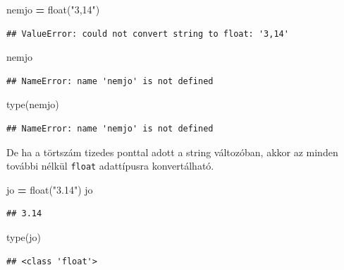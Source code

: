 \documentclass[
]{book}
\newenvironment{Shaded}{\begin{snugshade}}{\end{snugshade}}
\newcommand{\BuiltInTok}[1]{#1}
\newcommand{\NormalTok}[1]{#1}
\newcommand{\OperatorTok}[1]{\textcolor[rgb]{0.81,0.36,0.00}{\textbf{#1}}}
\newcommand{\StringTok}[1]{\textcolor[rgb]{0.31,0.60,0.02}{#1}}
\begin{document}
\begin{Shaded}
\begin{Highlighting}[]
\NormalTok{nemjo }\OperatorTok{=} \BuiltInTok{float}\NormalTok{(}\StringTok{"3,14"}\NormalTok{)}
\end{Highlighting}
\end{Shaded}

\begin{verbatim}
## ValueError: could not convert string to float: '3,14'
\end{verbatim}

\begin{Shaded}
\begin{Highlighting}[]
\NormalTok{nemjo}
\end{Highlighting}
\end{Shaded}

\begin{verbatim}
## NameError: name 'nemjo' is not defined
\end{verbatim}

\begin{Shaded}
\begin{Highlighting}[]
\BuiltInTok{type}\NormalTok{(nemjo)}
\end{Highlighting}
\end{Shaded}

\begin{verbatim}
## NameError: name 'nemjo' is not defined
\end{verbatim}

De ha a törtszám tizedes ponttal adott a string változóban, akkor az minden további nélkül \texttt{float} adattípusra konvertálható.

\begin{Shaded}
\begin{Highlighting}[]
\NormalTok{jo }\OperatorTok{=} \BuiltInTok{float}\NormalTok{(}\StringTok{"3.14"}\NormalTok{)}
\NormalTok{jo}
\end{Highlighting}
\end{Shaded}

\begin{verbatim}
## 3.14
\end{verbatim}

\begin{Shaded}
\begin{Highlighting}[]
\BuiltInTok{type}\NormalTok{(jo)}
\end{Highlighting}
\end{Shaded}

\begin{verbatim}
## <class 'float'>
\end{verbatim}
\end{document}
